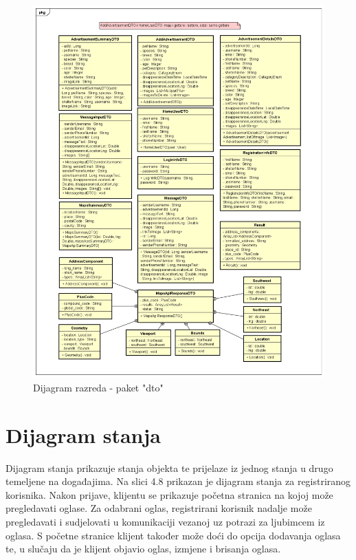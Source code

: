 			\begin{figure}[htb]
				\centering
				\includegraphics[width=\textwidth]{slike/dtoUML.png}
				\caption{Dijagram razreda - paket "dto"}
			\end{figure}
			\pagebreak

            \clearpage
            \newpage
            \eject
			
		\section{Dijagram stanja}
			
			
			\noindent Dijagram stanja prikazuje stanja objekta te prijelaze iz jednog stanja u drugo temeljene na događajima. Na slici 4.8 prikazan je dijagram stanja za registriranog korisnika. Nakon prijave, klijentu se prikazuje početna stranica na kojoj može pregledavati oglase. Za odabrani oglas, registrirani korisnik nadalje može pregledavati i sudjelovati u komunikaciji vezanoj uz potrazi za ljubimcem iz oglasa. S početne stranice klijent također može doći do opcija dodavanja oglasa te, u slučaju da je klijent objavio oglas, izmjene i brisanja oglasa.
			

